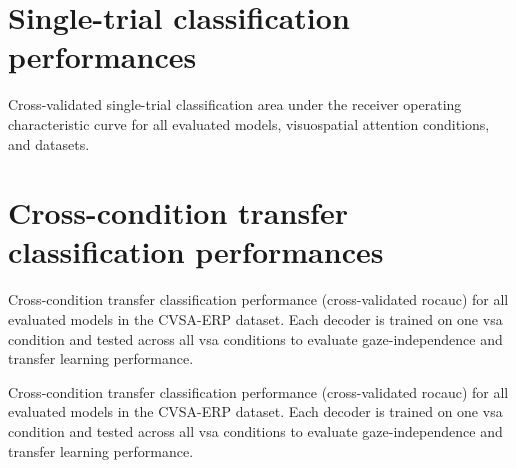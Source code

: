 \clearpage
\begin{subappendices}
  \section{Single-trial classification performances}
  \begin{table}[ht]
  \centering
  \makebox[\textwidth][c]{%
    
  }
  \caption{Cross-validated single-trial classification area under the receiver operating characteristic
curve for all evaluated models, visuospatial attention conditions, and
  datasets.}
  \label{tab:covert-align/results/single-trial}
\end{table}

  \clearpage
  \section{Cross-condition transfer classification performances}

  \begin{table}[ht]
      \footnotesize
      
      \caption[Transfer learning results for CVSA-ERP]{Cross-condition transfer
      classification performance (cross-validated \ac{rocauc})
      for all evaluated models in the CVSA-ERP dataset. Each decoder is trained
      on one \ac{vsa} condition and tested across all
      \ac{vsa}
      conditions to evaluate gaze-independence and transfer learning
      performance.}
  \end{table}
  \begin{table}[ht]
      \footnotesize
      
      \caption[Transfer learning results for BNCI2014-009]{Cross-condition transfer
      classification performance (cross-validated \ac{rocauc})
      for all evaluated models in the CVSA-ERP dataset. Each decoder is trained
      on one \ac{vsa} condition and tested across all \ac{vsa}
      conditions to evaluate gaze-independence and transfer learning
      performance.}
  \end{table}
\end{subappendices}
